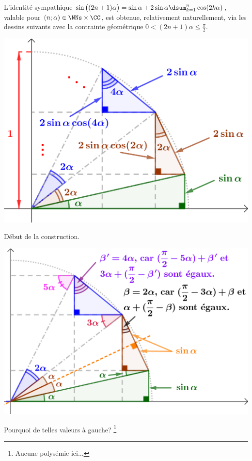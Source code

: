 \begin{example}
    L'identité sympathique
    $ \sin \big( (2n+1) \alpha \big)
    = \sin \alpha
    + 2 \sin \alpha \dsum_{k=1}^{n} \cos ( 2k \alpha )$,
    valable pour $(n ; \alpha) \in \NNs \times \CC$,
    est obtenue, relativement naturellement, via les dessins suivants avec la contrainte géométrique $0 < (2n +1) \alpha \leq \frac{\pi}{2}$.
	
	
	\begin{multicols}{2}
	\small\itshape
	\begin{center}
		\includegraphics[scale=.75]{tricky-trigo-sum.png}
		
		\smallskip
		Début de la construction.

		\includegraphics[scale=.75]{tricky-trigo-sum-why.png}
		
		\smallskip
		Pourquoi de telles valeurs à gauche?%
		\footnote{
		    Aucune polysémie ici...
		}
	\end{center}
	\end{multicols}
\end{example}
